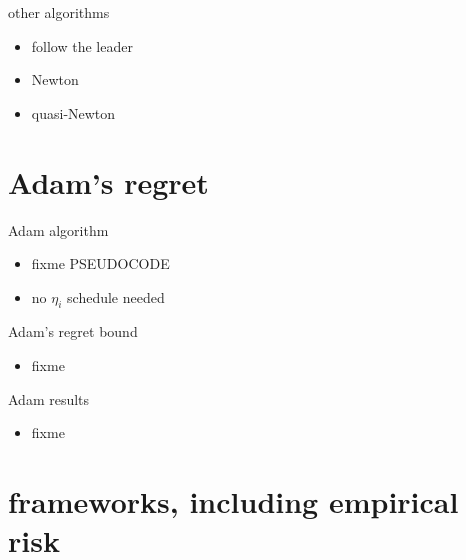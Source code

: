 \documentclass[xcolor={svgnames},
               hyperref={colorlinks,citecolor=DeepPink4,linkcolor=FireBrick,urlcolor=Maroon}]
               {beamer}
\begin{document}
\begin{frame}{other algorithms}

\begin{itemize}
\item follow the leader
\item Newton
\item quasi-Newton
\end{itemize}
\end{frame}


\section{Adam's regret}

\begin{frame}{Adam algorithm}

\begin{itemize}
\item fixme PSEUDOCODE
\item no $\eta_i$ schedule needed
\end{itemize}
\end{frame}


\begin{frame}{Adam's regret bound}

\begin{itemize}
\item fixme
\end{itemize}
\end{frame}


\begin{frame}{Adam results}

\begin{itemize}
\item fixme
\end{itemize}
\end{frame}


\section{frameworks, including empirical risk}
\end{document}
